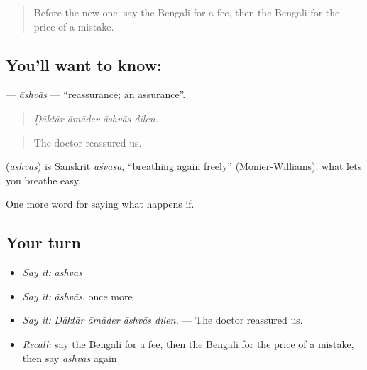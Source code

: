 \label{lesson:BN-C540-ashvas}



\begin{quote}
Before the new one: say the Bengali for a fee, then the Bengali for the price of a mistake.
\end{quote}

\subsection*{You'll want to know: }
\textbf{} — \emph{āshvās} — \textquotedblleft{}reassurance; an assurance\textquotedblright{}.

\begin{quote}
   
\end{quote}

\begin{quote}
\emph{Ḍāktār āmāder āshvās dilen.}
\end{quote}

\begin{quote}
The doctor reassured us.
\end{quote}

\begin{cousinweb}
\textbf{} (\emph{āshvās}) is Sanskrit \emph{āśvāsa}, \textquotedblleft{}breathing again freely\textquotedblright{} (Monier-Williams): what lets you breathe easy.
\end{cousinweb}

\begin{grammarlens}[title={What you've built}]
One more word for saying what happens if.
\end{grammarlens}

\subsection*{Your turn}
\begin{itemize}
\raggedright
  \item \emph{Say it:} \emph{āshvās}
  \item \emph{Say it:} \emph{āshvās}, once more
  \item \emph{Say it:} \emph{Ḍāktār āmāder āshvās dilen.} — The doctor reassured us.
  \item \emph{Recall:} say the Bengali for a fee, then the Bengali for the price of a mistake, then say \emph{āshvās} again
\end{itemize}

